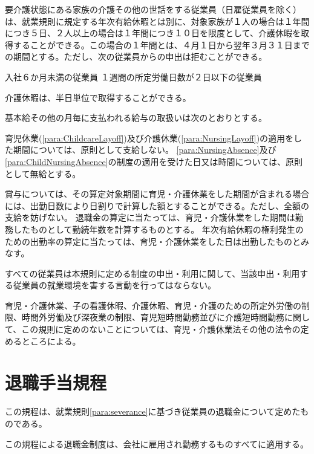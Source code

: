 \documentclass[10pt,a4paper]{jsarticle}
\begin{document}
要介護状態にある家族の介護その他の世話をする従業員（日雇従業員を除く）は、就業規則に規定する年次有給休暇とは別に、対象家族が１人の場合は１年間につき５日、２人以上の場合は１年間につき１０日を限度として、介護休暇を取得することができる。この場合の１年間とは、４月１日から翌年３月３１日までの期間とする。ただし、次の従業員からの申出は拒むことができる。
\label{para:NursingAbsence}
\begin{enumerate}
    \itm 	入社６か月未満の従業員
    \itm 	１週間の所定労働日数が２日以下の従業員
\end{enumerate}
\term 介護休暇は、半日単位で取得することができる。

基本給その他の月毎に支払われる給与の取扱いは次のとおりとする。
\begin{enumerate}
    \itm 育児休業(\ref{para:ChildcareLayoff})及び介護休業(\ref{para:NursingLayoff})の適用をした期間については、原則として支給しない。
    \itm \ref{para:NursingAbsence}及び\ref{para:ChildNursingAbsence}の制度の適用を受けた日又は時間については、原則として無給とする。
\end{enumerate}
\term 賞与については、その算定対象期間に育児・介護休業をした期間が含まれる場合には、出勤日数により日割りで計算した額とすることができる。ただし、全額の支給を妨げない。
\term 退職金の算定に当たっては、育児・介護休業をした期間は勤務したものとして勤続年数を計算するものとする。
\term 年次有給休暇の権利発生のための出勤率の算定に当たっては、育児・介護休業をした日は出勤したものとみなす。

すべての従業員は本規則に定める制度の申出・利用に関して、当該申出・利用する従業員の就業環境を害する言動を行ってはならない。

育児・介護休業、子の看護休暇、介護休暇、育児・介護のための所定外労働の制限、時間外労働及び深夜業の制限、育児短時間勤務並びに介護短時間勤務に関して、この規則に定めのないことについては、育児・介護休業法その他の法令の定めるところによる。


\clearpage
\section{退職手当規程}

この規程は、就業規則\ref{para:severance}に基づき従業員の退職金について定めたものである。

この規程による退職金制度は、会社に雇用され勤務するものすべてに適用する。
\end{document}
